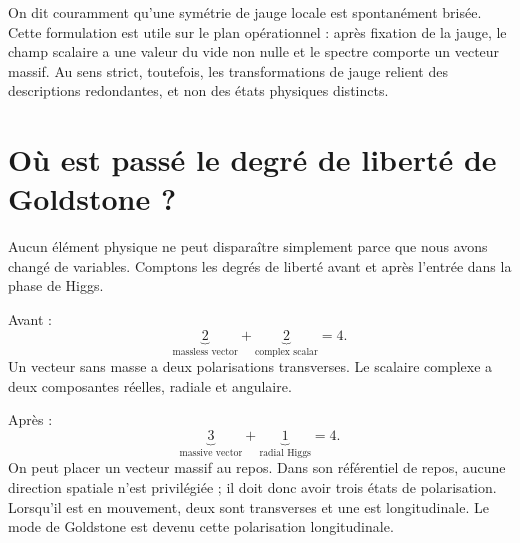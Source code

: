 On dit couramment qu’une symétrie de jauge locale est spontanément brisée. Cette formulation est utile sur le plan opérationnel : après fixation de la jauge, le champ scalaire a une valeur du vide non nulle et le spectre comporte un vecteur massif. Au sens strict, toutefois, les transformations de jauge relient des descriptions redondantes, et non des états physiques distincts.

\section{Où est passé le degré de liberté de Goldstone ?}

Aucun élément physique ne peut disparaître simplement parce que nous avons changé de variables. Comptons les degrés de liberté avant et après l’entrée dans la phase de Higgs.

Avant :
\begin{equation}
  \underbrace{2}_{\text{massless vector}}
  +
  \underbrace{2}_{\text{complex scalar}}
  =4.
\end{equation}
Un vecteur sans masse a deux polarisations transverses. Le scalaire complexe a deux composantes réelles, radiale et angulaire.

Après :
\begin{equation}
  \underbrace{3}_{\text{massive vector}}
  +
  \underbrace{1}_{\text{radial Higgs}}
  =4.
  \label{eq:l08-degree-count}
\end{equation}
On peut placer un vecteur massif au repos. Dans son référentiel de repos, aucune direction spatiale n’est privilégiée ; il doit donc avoir trois états de polarisation. Lorsqu’il est en mouvement, deux sont transverses et une est longitudinale. Le mode de Goldstone est devenu cette polarisation longitudinale.

